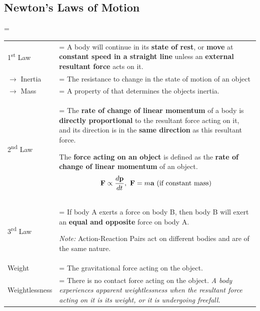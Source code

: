 \documentclass[a4paper,11pt]{article}
\newlength{\oldparskip}
\begin{document}
		\subsection{Newton's Laws of Motion}
			\oldparskip=\parskip
			\begin{center}
				\renewcommand{\arraystretch}{1.2}
				\begin{tabular}{@{} l >{\parskip=\oldparskip}p{11.5cm} @{}}
					\toprule
					1\textsuperscript{st} Law & A body will continue in its \textbf{state of rest}, or \textbf{move} at \textbf{constant speed in a straight line} unless an \textbf{external resultant force} acts on it.\\
					$\rightarrow$ Inertia & The resistance to change in the state of motion of an object \\
					$\rightarrow$ Mass & A property of that determines the objects inertia. \\
					\midrule
					2\textsuperscript{nd} Law & The \textbf{rate of change of linear momentum} of a body is \textbf{directly proportional} to the resultant force acting on it, and its direction is in the \textbf{same direction} as this resultant force. \par The \textbf{force acting on an object} is defined as the \textbf{rate of change of linear momentum} of an object. $$\textbf{F} \propto \frac{d\textbf{p}}{dt}, ~\textbf{F}=m\textbf{a} \textrm{ (if constant mass)} \vspace*{-\baselineskip}$$ \\
					\midrule
					3\textsuperscript{rd} Law & If body A exerts a force on body B, then body B will exert an \textbf{equal and opposite} force on body A. \par \textit{Note:} Action-Reaction Pairs act on different bodies and are of the same nature.\\
					\midrule
					Weight & The gravitational force acting on the object. \\
					Weightlessness & There is no contact force acting on the object. \textit{A body experiences apparent weightlessness when the resultant force acting on it is its weight, or it is undergoing freefall.} \\
					\bottomrule
				\end{tabular}
			\end{center}
\end{document}
